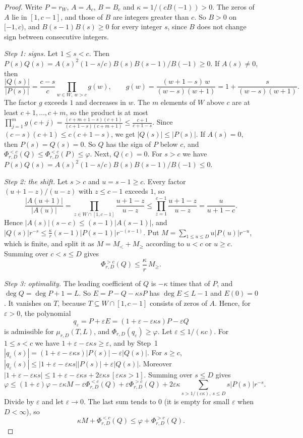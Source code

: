 \documentclass[11pt]{article}
\begin{document}
\begin{proof}
Write $P=r_W$, $A=A_c$, $B=B_c$ and $\kappa=1/(cB(-1))>0$.  The zeros of $A$
lie in $[1,c-1]$, and those of $B$ are integers greater than $c$.  So $B>0$ on
$[-1,c)$, and $B(s-1)B(s)\ge0$ for every integer $s$, since $B$ does not
change sign between consecutive integers.

\emph{Step 1: signs.}  Let $1\le s<c$.  Then $P(s)Q(s)=A(s)^2(1-s/c)B(s)B(s-1)/B(-1)\ge0$.  If
$A(s)\ne0$, then
\[
  \frac{|Q(s)|}{|P(s)|}=\frac{c-s}c\prod_{w\in W,\ w>c}g(w),\qquad
  g(w)=\frac{(w+1-s)\,w}{(w-s)(w+1)}=1+\frac s{(w-s)(w+1)} .
\]
The factor $g$ exceeds $1$ and decreases in $w$.  The $m$ elements of $W$
above $c$ are at least $c+1,\ldots,c+m$, so the product is at most
$\prod_{j=1}^mg(c+j)=\frac{(c+m+1-s)(c+1)}{(c+1-s)(c+m+1)}\le\frac{c+1}{c+1-s}$.
Since $(c-s)(c+1)\le c(c+1-s)$, we get $|Q(s)|\le|P(s)|$.  If $A(s)=0$, then
$P(s)=Q(s)=0$.  So $Q$ has the sign of $P$ below $c$, and
$\Phi_{r,D}^{<c}(Q)\le\Phi_{r,D}^{<c}(P)\le\varphi$.  Next, $Q(c)=0$.  For
$s>c$ we have $P(s)Q(s)=A(s)^2(1-s/c)B(s)B(s-1)/B(-1)\le0$.

\emph{Step 2: the shift.}  Let $s>c$ and $u=s-1\ge c$.  Every factor
$(u+1-z)/(u-z)$ with $z\le c-1$ exceeds $1$, so
\[
  \frac{|A(u+1)|}{|A(u)|}=\prod_{z\in W\cap[1,c-1]}\frac{u+1-z}{u-z}
  \le\prod_{z=1}^{c-1}\frac{u+1-z}{u-z}=\frac u{u+1-c} .
\]
Hence $|A(s)|(s-c)\le(s-1)|A(s-1)|$, and
$|Q(s)|r^{-s}\le\frac\kappa r(s-1)|P(s-1)|r^{-(s-1)}$.  Put
$M=\sum_{1\le u\le D}u|P(u)|r^{-u}$, which is finite, and split it as
$M=M_<+M_\ge$ according to $u<c$ or $u\ge c$.  Summing over $c<s\le D$ gives
\[
  \Phi_{r,D}^{>c}(Q)\le\frac\kappa r\,M_\ge .
\]

\emph{Step 3: optimality.}  The leading coefficient of $Q$ is $-\kappa$ times
that of $P$, and $\deg Q=\deg P+1=L$.  So $E=P-Q-\kappa sP$ has
$\deg E\le L-1$ and $E(0)=0$.  It vanishes on $T$, because $T\subseteq W\cap[1,c-1]$
consists of zeros of $A$.  Hence, for $\varepsilon>0$, the polynomial
\[
  q_\varepsilon=P+\varepsilon E=(1+\varepsilon-\varepsilon\kappa s)P-\varepsilon Q
\]
is admissible for $\mu_{r,D}(T,L)$, and $\Phi_{r,D}(q_\varepsilon)\ge\varphi$.
Let $\varepsilon\le1/(\kappa c)$.  For $1\le s<c$ we have
$1+\varepsilon-\varepsilon\kappa s\ge\varepsilon$, and by Step~1
$|q_\varepsilon(s)|=(1+\varepsilon-\varepsilon\kappa s)|P(s)|-\varepsilon|Q(s)|$.
For $s\ge c$, $|q_\varepsilon(s)|\le|1+\varepsilon-\varepsilon\kappa s||P(s)|+\varepsilon|Q(s)|$.
Moreover
$|1+\varepsilon-\varepsilon\kappa s|\le1+\varepsilon-\varepsilon\kappa s+2\varepsilon\kappa s\,[\varepsilon\kappa s>1]$.
Summing over $s\le D$ gives
\[
  \varphi\le(1+\varepsilon)\varphi-\varepsilon\kappa M
  -\varepsilon\Phi_{r,D}^{<c}(Q)+\varepsilon\Phi_{r,D}^{>c}(Q)
  +2\varepsilon\kappa\!\!\sum_{s>1/(\varepsilon\kappa),\ s\le D}\!\!s|P(s)|r^{-s}.
\]
Divide by $\varepsilon$ and let $\varepsilon\to0$.  The last sum tends to $0$
(it is empty for small $\varepsilon$ when $D<\infty$), so
\[
  \kappa M+\Phi_{r,D}^{<c}(Q)\le\varphi+\Phi_{r,D}^{>c}(Q).
\]


\end{proof}
\end{document}
